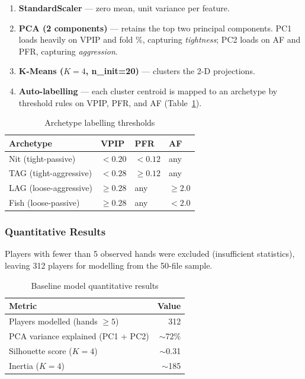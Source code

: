 \documentclass{article}
\begin{document}
\begin{enumerate}[noitemsep]
  \item \textbf{StandardScaler} — zero mean, unit variance per feature.
  \item \textbf{PCA (2 components)} — retains the top two principal components.
        PC1 loads heavily on VPIP and fold \%, capturing \emph{tightness};
        PC2 loads on AF and PFR, capturing \emph{aggression}.
  \item \textbf{K-Means ($K=4$, n\_init=20)} — clusters the 2-D projections.
  \item \textbf{Auto-labelling} — each cluster centroid is mapped to an archetype
        by threshold rules on VPIP, PFR, and AF (Table~\ref{tab:thresholds}).
\end{enumerate}

\begin{table}[H]
\centering
\caption{Archetype labelling thresholds}
\label{tab:thresholds}
\begin{tabular}{llll}
\toprule
\textbf{Archetype} & \textbf{VPIP} & \textbf{PFR} & \textbf{AF} \\
\midrule
Nit (tight-passive)    & $< 0.20$ & $< 0.12$ & any \\
TAG (tight-aggressive) & $< 0.28$ & $\ge 0.12$ & any \\
LAG (loose-aggressive) & $\ge 0.28$ & any & $\ge 2.0$ \\
Fish (loose-passive)   & $\ge 0.28$ & any & $< 2.0$ \\
\bottomrule
\end{tabular}
\end{table}

\subsubsection{Quantitative Results}
Players with fewer than 5 observed hands were excluded (insufficient statistics),
leaving 312 players for modelling from the 50-file sample.

\begin{table}[H]
\centering
\caption{Baseline model quantitative results}
\label{tab:baseline_results}
\begin{tabular}{lr}
\toprule
\textbf{Metric} & \textbf{Value} \\
\midrule
Players modelled (hands $\ge 5$) & 312 \\
PCA variance explained (PC1 + PC2) & $\sim$72\% \\
Silhouette score ($K=4$) & $\sim$0.31 \\
Inertia ($K=4$) & $\sim$185 \\
\bottomrule
\end{tabular}
\end{table}
\end{document}
